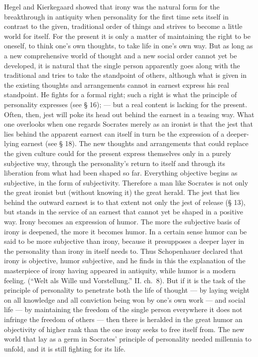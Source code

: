 \documentclass[12pt]{book}
\newcommand{\opage}[1]{\marginnote{\footnotesize\textit{[#1]}}}
\begin{document}
Hegel and Kierkegaard showed that irony was the natural form for the breakthrough in antiquity
when personality for the first time sets itself in contrast to the given, traditional order
of things and strives to become a little world for itself. For the present it is only a matter
of maintaining the right to be oneself, to think one's own thoughts, to take life in one's own
way. But as long as a new comprehensive world of thought and a new social order cannot yet be
developed, it is natural that \opage{138}the single person apparently goes along with the
traditional and tries to take the standpoint of others, although what is given in the
existing thoughts and arrangements cannot in earnest express his real standpoint. He fights
for a formal right; such a right is what the principle of personality expresses (see § 16);
--- but a real content is lacking for the present. Often, then, jest will poke its head out
behind the earnest in a teasing way. What one overlooks when one regards Socrates merely as an
ironist is that the jest that lies behind the apparent earnest can itself in turn be the
expression of a deeper-lying earnest (see § 18). The new thoughts and arrangements that could
replace the given culture could for the present express themselves only in a purely subjective
way, through the personality's return to itself and through its liberation from what had
been shaped so far. Everything objective begins as subjective, in the form of subjectivity.
Therefore a man like Socrates is not only the great ironist but (without knowing it) the great
herald. The jest that lies behind the outward earnest is to that extent not only the jest of
release (§ 13), but stands in the service of an earnest that cannot yet be shaped in a positive
way. Irony becomes an expression of humor. The more the subjective basis of irony is deepened,
the more it becomes humor. In a certain sense humor can be said to be more subjective than
irony, because it presupposes a deeper layer in the personality than irony in itself needs to.
Thus Schopenhauer declared that irony is objective, humor subjective, and he finds in this the
explanation of the masterpiece of irony having appeared in antiquity, while humor is a modern
feeling. (``Welt als Wille und Vorstellung.'' II. ch.~8). But if it is the task of the
principle of personality to penetrate both the life of thought --- by laying weight on all
knowledge and all conviction being won by one's own work --- and social life --- by
maintaining the freedom of the single person everywhere it does not infringe the freedom of
others --- then there is heralded in the great humor an objectivity of higher rank than the
one irony seeks to free itself from. The new world that lay as a germ in Socrates' principle
of personality needed millennia to unfold, and it is still fighting for its life.
\end{document}
